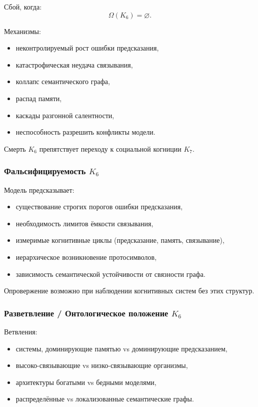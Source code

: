Сбой, когда:
\[
\Omega(K_6) = \varnothing.
\]

Механизмы:
\begin{itemize}
    \item неконтролируемый рост ошибки предсказания,
    \item катастрофическая неудача связывания,
    \item коллапс семантического графа,
    \item распад памяти,
    \item каскады разгонной салентности,
    \item неспособность разрешить конфликты модели.
\end{itemize}

Смерть $K_6$ препятствует переходу к социальной когниции $K_7$.

\subsubsection{Фальсифицируемость \texorpdfstring{$K_6$}{K_6}}

Модель предсказывает:
\begin{itemize}
    \item существование строгих порогов ошибки предсказания,
    \item необходимость лимитов ёмкости связывания,
    \item измеримые когнитивные циклы (предсказание, память, связывание),
    \item иерархическое возникновение протосимволов,
    \item зависимость семантической устойчивости от связности графа.
\end{itemize}

Опровержение возможно при наблюдении когнитивных систем без этих структур.

\subsubsection{Разветвление / Онтологическое положение \texorpdfstring{$K_6$}{K_6}}

Ветвления:
\begin{itemize}
    \item системы, доминирующие памятью vs доминирующие предсказанием,
    \item высоко-связывающие vs низко-связывающие организмы,
    \item архитектуры богатыми vs бедными моделями,
    \item распределённые vs локализованные семантические графы.
\end{itemize}

